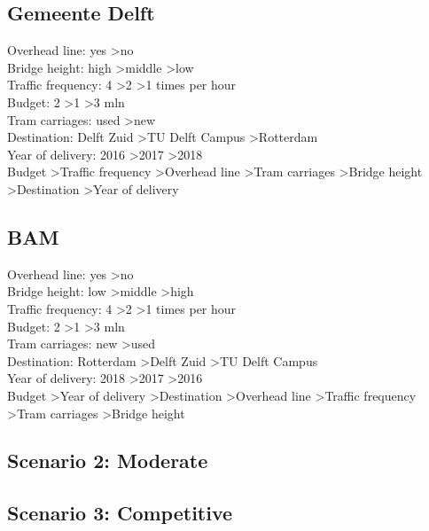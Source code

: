 \documentclass{article}
\begin{document}
\subsection{Gemeente Delft}
Overhead line: yes \textgreater no \\
Bridge height: high \textgreater middle \textgreater low \\
Traffic frequency: 4 \textgreater 2 \textgreater 1 times per hour \\
Budget: 2 \textgreater 1 \textgreater 3 mln \\
Tram carriages: used \textgreater new \\
Destination: Delft Zuid \textgreater TU Delft Campus \textgreater Rotterdam \\
Year of delivery: 2016 \textgreater 2017 \textgreater 2018 \\

Budget \textgreater Traffic frequency \textgreater Overhead line \textgreater Tram carriages \textgreater Bridge height \textgreater Destination \textgreater Year of delivery

\subsection{BAM}
Overhead line: yes \textgreater no \\
Bridge height: low \textgreater middle \textgreater high \\
Traffic frequency: 4 \textgreater 2 \textgreater 1 times per hour \\
Budget: 2 \textgreater 1 \textgreater 3 mln \\
Tram carriages: new \textgreater used \\
Destination: Rotterdam \textgreater Delft Zuid \textgreater TU Delft Campus \\
Year of delivery: 2018 \textgreater 2017 \textgreater 2016 \\

Budget \textgreater Year of delivery \textgreater Destination \textgreater Overhead line \textgreater Traffic frequency \textgreater Tram carriages \textgreater Bridge height\\

\subsection{Scenario 2: Moderate}


\subsection{Scenario 3: Competitive}
\end{document}

